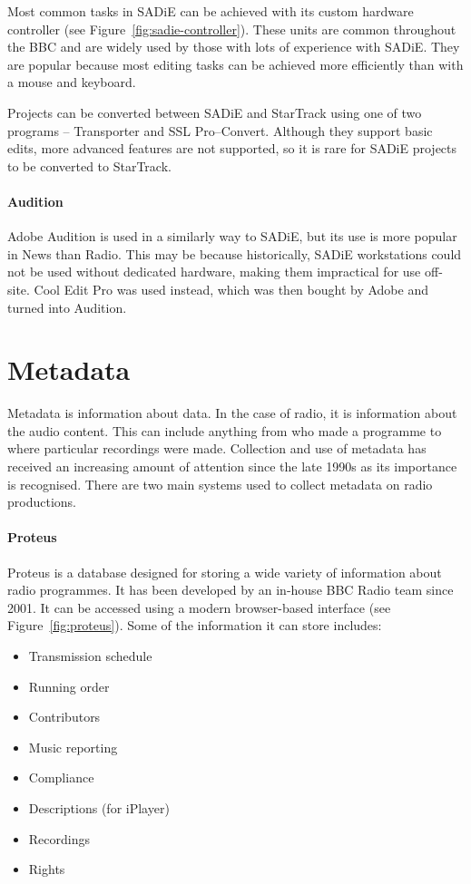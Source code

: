 Most common tasks in SADiE can be achieved with its custom hardware controller
(see Figure~\ref{fig:sadie-controller}). These units are common throughout the
BBC and are widely used by those with lots of experience with SADiE. They are
popular because most editing tasks can be achieved more efficiently than with a
mouse and keyboard.

Projects can be converted between SADiE and StarTrack using one of two programs
-- Transporter and SSL Pro--Convert. Although they support basic edits, more
advanced features are not supported, so it is rare for SADiE projects to be
converted to StarTrack.

\paragraph{Audition}
Adobe Audition is used in a similarly way to SADiE, but its use is more popular
in News than Radio. This may be because historically, SADiE workstations could
not be used without dedicated hardware, making them impractical for use
off-site. Cool Edit Pro was used instead, which was then bought by Adobe and
turned into Audition.

\section{Metadata}
Metadata is information about data. In the case of radio, it is information
about the audio content. This can include anything from who made a programme to
where particular recordings were made. Collection and use of metadata has
received an increasing amount of attention since the late 1990s as its
importance is recognised. There are two main systems used to collect metadata
on radio productions.

\paragraph{Proteus}
Proteus is a database designed for storing a wide variety of information about
radio programmes. It has been developed by an in-house BBC Radio team since
2001. It can be accessed using a modern browser-based interface (see
Figure~\ref{fig:proteus}). Some of the information it can store includes:
\begin{itemize}
  \item Transmission schedule
  \item Running order
  \item Contributors
  \item Music reporting
  \item Compliance
  \item Descriptions (for iPlayer)
  \item Recordings
  \item Rights
\end{itemize}

